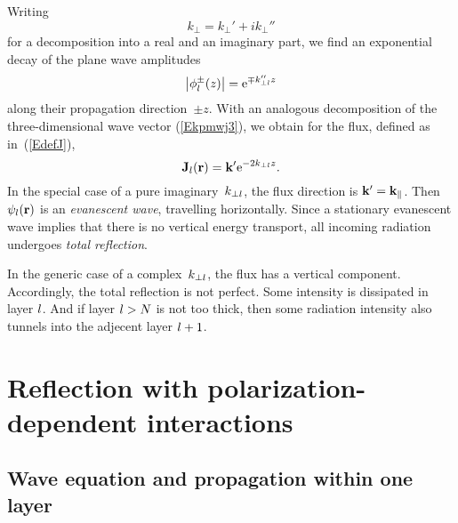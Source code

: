 Writing
\begin{equation}
  k_\perp = k_\perp' + i k_\perp''
\end{equation}
for a decomposition into a real and an imaginary part,
we find an exponential decay of the plane wave amplitudes
\begin{equation}\label{Ephidamp}
  \left|\phi^\pm_l(z)\right|
  = \text{e}^{\mp k_{\perp l}'' z}
\end{equation}
along their propagation direction~$\pm z$.
With an analogous decomposition
of the three-dimensional wave vector (\ref{Ekpmwj3}),
we obtain for the flux, defined as in~(\ref{EdefJ}),
\begin{equation}
  \mathbf{J}_l(\mathbf{r}) = \mathbf{k}' \text{e}^{-2k_{\perp l}z}.
\end{equation}
In the special case of a pure imaginary~$k_{\perp l}$,
the flux direction is $\mathbf{k}'=\mathbf{k}_\parallel$.
Then $\psi_l(\mathbf{r})$ is an \textit{evanescent wave},
%
travelling horizontally.
Since a stationary evanescent wave implies that there is
no vertical energy transport,
all incoming radiation undergoes \textit{total reflection}.
%

In the generic case of a complex~$k_{\perp l}$,
the flux has a vertical component.
Accordingly, the total reflection is not perfect.
Some intensity is dissipated in layer $l$.
%
And if layer $l>N$ is not too thick,
then some radiation intensity also tunnels into the adjecent layer $l+1$.
%


\section{Reflection with polarization-dependent interactions}\label{s:pol}



\subsection{Wave equation and propagation within one layer}

